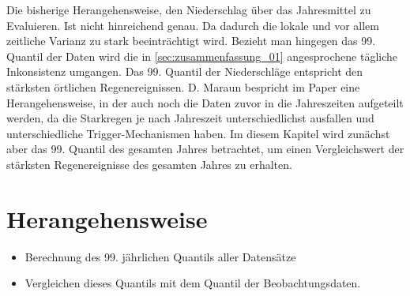 Die bisherige Herangehensweise, den Niederschlag über das Jahresmittel zu Evaluieren. Ist nicht hinreichend genau. Da dadurch die lokale und vor allem zeitliche Varianz zu stark beeinträchtigt wird. Bezieht man hingegen das 99. Quantil der Daten wird die in \ref{sec:zusammenfassung_01} angesprochene tägliche Inkonsistenz umgangen. Das 99. Quantil der Niederschläge entspricht den stärksten örtlichen Regenereignissen. D. Maraun bespricht im Paper \cite{biasMaraun} eine Herangehensweise, in der auch noch die Daten zuvor in die Jahreszeiten aufgeteilt werden, da die Starkregen je nach Jahreszeit unterschiedlichst ausfallen und unterschiedliche Trigger-Mechanismen haben. Im diesem Kapitel wird zunächst aber das 99. Quantil des gesamten Jahres betrachtet, um einen Vergleichswert der stärksten Regenereignisse des gesamten Jahres zu erhalten.
\section{Herangehensweise}
\begin{itemize}
	\item Berechnung des 99. jährlichen Quantils aller Datensätze
	\item Vergleichen dieses Quantils mit dem Quantil der Beobachtungsdaten.
\end{itemize}

